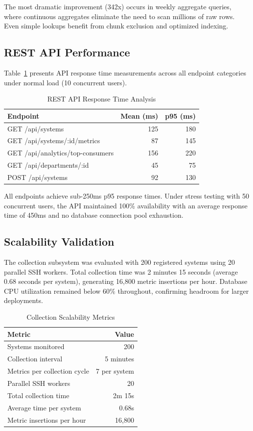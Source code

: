 \documentclass{ieeeaccess}
\begin{document}
The most dramatic improvement (342x) occurs in weekly aggregate queries, where continuous aggregates eliminate the need to scan millions of raw rows. Even simple lookups benefit from chunk exclusion and optimized indexing.

\subsection{REST API Performance}
Table~\ref{tab:api_perf} presents API response time measurements across all endpoint categories under normal load (10 concurrent users).

\begin{table}[h]
\centering
\caption{REST API Response Time Analysis}
\label{tab:api_perf}
\begin{tabular}{l r r}
\hline
\textbf{Endpoint} & \textbf{Mean (ms)} & \textbf{p95 (ms)} \\
\hline
GET /api/systems & 125 & 180 \\
GET /api/systems/:id/metrics & 87 & 145 \\
GET /api/analytics/top-consumers & 156 & 220 \\
GET /api/departments/:id & 45 & 75 \\
POST /api/systems & 92 & 130 \\
\hline
\end{tabular}
\end{table}

All endpoints achieve sub-250ms p95 response times. Under stress testing with 50 concurrent users, the API maintained 100\% availability with an average response time of 450ms and no database connection pool exhaustion.

\subsection{Scalability Validation}
The collection subsystem was evaluated with 200 registered systems using 20 parallel SSH workers. Total collection time was 2 minutes 15 seconds (average 0.68 seconds per system), generating 16,800 metric insertions per hour. Database CPU utilization remained below 60\% throughout, confirming headroom for larger deployments.

\begin{table}[h]
\centering
\caption{Collection Scalability Metrics}
\label{tab:collection}
\begin{tabular}{l r}
\hline
\textbf{Metric} & \textbf{Value} \\
\hline
Systems monitored & 200 \\
Collection interval & 5 minutes \\
Metrics per collection cycle & 7 per system \\
Parallel SSH workers & 20 \\
Total collection time & 2m 15s \\
Average time per system & 0.68s \\
Metric insertions per hour & 16,800 \\
\hline
\end{tabular}
\end{table}
\end{document}
